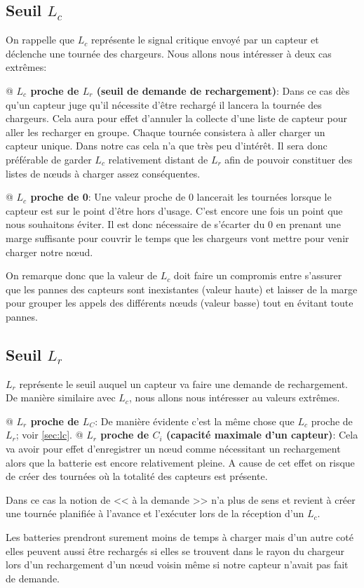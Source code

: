 \documentclass[noposter,final]{polytech/polytech}
\begin{document}
		\subsection{Seuil $L_c$\label{sec:lc}}
			On rappelle que $L_c$ représente le signal critique envoyé par un capteur et déclenche une tournée des chargeurs.
			Nous allons nous intéresser à deux cas extrêmes:
			\begin{easylist}
				@ \textbf{$L_c$ proche de $L_r$ (seuil de demande de rechargement)}: Dans ce cas dès qu'un capteur juge qu'il nécessite d'être rechargé il lancera la tournée des chargeurs.
				Cela aura pour effet d'annuler la collecte d'une liste de capteur pour aller les recharger en groupe.
				Chaque tournée consistera à aller charger un capteur unique.
				Dans notre cas cela n'a que très peu d'intérêt.
				Il sera donc préférable de garder $L_c$ relativement distant de $L_r$ afin de pouvoir constituer des listes de n\oe uds à charger assez conséquentes.
				
				@ \textbf{$L_c$ proche de 0}: Une valeur proche de 0 lancerait les tournées lorsque le capteur est sur le point d'être hors d'usage.
				C'est encore une fois un point que nous souhaitons éviter.
				Il est donc nécessaire de s'écarter du 0 en prenant une marge suffisante pour couvrir le temps que les chargeurs vont mettre pour venir charger notre n\oe ud.
			\end{easylist}
			
			On remarque donc que la valeur de $L_c$ doit faire un compromis entre s'assurer que les pannes des capteurs sont inexistantes (valeur haute) et laisser de la marge pour grouper les appels des différents n\oe uds (valeur basse) tout en évitant toute pannes.
			
		\subsection{Seuil $L_r$}
			$L_r$ représente le seuil auquel un capteur va faire une demande de rechargement.
			De manière similaire avec $L_c$, nous allons nous intéresser au valeurs extrêmes.
			
			\begin{easylist}
				@ \textbf{$L_r$ proche de $L_C$}: De manière évidente c'est la même chose que $L_c$ proche de $L_r$; voir \autoref{sec:lc}.
				@ \textbf{$L_r$ proche de $C_i$ (capacité maximale d'un capteur)}: Cela va avoir pour effet d'enregistrer un n\oe ud comme nécessitant un rechargement alors que la batterie est encore relativement pleine.
				A cause de cet effet on risque de créer des tournées où la totalité des capteurs est présente.
				
				Dans ce cas la notion de << à la demande >> n'a plus de sens et revient à créer une tournée planifiée à l'avance et l'exécuter lors de la réception d'un $L_c$.
				
				Les batteries prendront surement moins de temps à charger mais d'un autre coté elles peuvent aussi être rechargés si elles se trouvent dans le rayon du chargeur lors d'un rechargement d'un n\oe ud voisin même si notre capteur n'avait pas fait de demande.
			\end{easylist}
			
\end{document}
